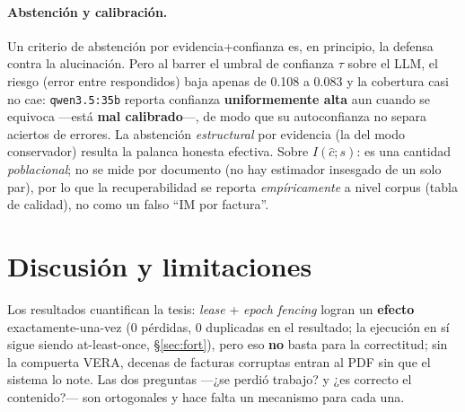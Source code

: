 
\paragraph{Abstención y calibración.} Un criterio de abstención por evidencia+confianza es, en
principio, la defensa contra la alucinación. Pero al barrer el umbral de confianza $\tau$ sobre
el LLM, el riesgo (error entre respondidos) baja apenas de 0.108 a 0.083 y la cobertura casi no
cae: \texttt{qwen3.5:35b} reporta confianza \textbf{uniformemente alta} aun cuando se equivoca
---está \textbf{mal calibrado}---, de modo que su autoconfianza no separa aciertos de errores.
La abstención \emph{estructural} por evidencia (la del modo conservador) resulta la palanca
honesta efectiva. Sobre $I(\hat c;s)$: es una cantidad \emph{poblacional}; no se mide por
documento (no hay estimador insesgado de un solo par), por lo que la recuperabilidad se reporta
\emph{empíricamente} a nivel corpus (tabla de calidad), no como un falso ``IM por factura''.

\section{Discusión y limitaciones}

Los resultados cuantifican la tesis: \emph{lease} + \emph{epoch fencing} logran un
\textbf{efecto} exactamente-una-vez (0 pérdidas, 0 duplicadas en el resultado; la ejecución en
sí sigue siendo at-least-once, §\ref{sec:fort}), pero eso \textbf{no} basta para
la correctitud; sin la compuerta VERA, decenas de facturas corruptas entran al PDF sin que el
sistema lo note. Las dos preguntas ---¿se perdió trabajo? y ¿es correcto el contenido?--- son
ortogonales y hace falta un mecanismo para cada una.

